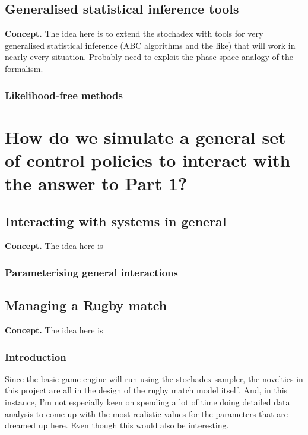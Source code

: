 \documentclass{book}
\begin{document}
\chapter{\sffamily Generalised statistical inference tools}

{\bfseries\sffamily Concept.} The idea here is to extend the stochadex with tools for very generalised statistical inference (ABC algorithms and the like) that will work in nearly every situation. Probably need to exploit the phase space analogy of the formalism.

\section{\sffamily Likelihood-free methods}


\part*{{ How do we simulate a general set of control policies to interact with the answer to Part 1?}}


\chapter{\sffamily Interacting with systems in general}

{\bfseries\sffamily Concept.} The idea here is 

\section{\sffamily Parameterising general interactions}


\chapter{\sffamily Managing a Rugby match}

{\bfseries\sffamily Concept.} The idea here is 

\section{\sffamily Introduction}

Since the basic game engine will run using the \href{https://github.com/umbralcalc/stochadex}{stochadex} sampler, the novelties in this project are all in the design of the rugby match model itself. And, in this instance, I'm not especially keen on spending a lot of time doing detailed data analysis to come up with the most realistic values for the parameters that are dreamed up here. Even though this would also be interesting.
\end{document}
